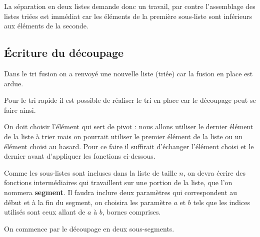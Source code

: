 La séparation en deux listes demande donc un travail, par contre l'assemblage des listes triées est immédiat car les éléments de la première sous-liste sont inférieurs aux éléments de la seconde.
\subsection{Écriture du découpage}
Dans le tri fusion on a renvoyé une nouvelle liste (triée) car la fusion en place est ardue.

Pour le tri rapide il est possible de réaliser le tri en place car le découpage peut se faire ainsi.

On doit choisir l'élément qui sert de pivot : nous allons utiliser le dernier élément de la liste à trier mais on pourrait utiliser le premier élément de la liste ou un élément choisi au hasard. Pour ce faire il suffirait d'échanger l'élément choisi et le dernier avant d'appliquer les fonctions ci-dessous.

Comme les sous-listes sont incluses dans la liste de taille $n$, on devra écrire des fonctions intermédiaires qui travaillent sur une portion de la liste, que l'on nommera {\bf segment}. Il faudra inclure deux paramètres qui correspondent au début et à la fin du segment, on choisira les paramètre $a$ et $b$ tels que les indices utilisés sont ceux allant de $a$ à $b$, bornes comprises.

\medskip

On commence par le découpage en deux sous-segments.

